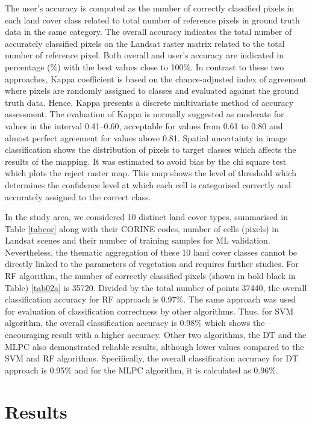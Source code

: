 \documentclass[remotesensing,article,submit,pdftex,moreauthors]{Definitions/mdpi}
\begin{document}
The user's accuracy is computed as the number of correctly classified pixels in each land cover class related to total number of reference pixels in {ground truth} data in the same category. The overall accuracy indicates the total number of accurately classified pixels on the Landsat raster matrix related to the total number of reference pixel. Both overall and user's accuracy are indicated in percentage (\%) with the best values close to 100\%. In contrast to these two approaches, Kappa coefficient is based on the chance-adjusted index of agreement where pixels are randomly assigned to classes and evaluated against the ground truth data. Hence, Kappa presents a discrete multivariate method of accuracy assessment. The evaluation of Kappa is normally suggested as moderate for values in the interval 0.41--0.60, acceptable for values from 0.61 to 0.80 and almost perfect agreement for values above 0.81{. Spatial uncertainty in image classification shows the distribution of pixels to target classes which affects the results of the mapping. It was estimated to avoid bias by the chi square test which plots the reject raster map. This map shows the level of threshold which determines the confidence level at which each cell is categorised correctly and accurately assigned to the correct class.}

In the study area, we {considered 10 distinct land cover types}, summarised in Table \ref{tabcor} along with their CORINE codes, number of cells (pixels) in Landsat scenes and their number of training samples for ML validation. Nevertheless, the thematic aggregation of these 10 land cover classes cannot be directly linked to the parameters of vegetation and requires further studies{. For} RF algorithm, the number of correctly classified pixels (shown in bold black in Table) \ref{tab02a} is 35720. Divided by the total number of points 37440, the overall classification accuracy for RF approach is 0.97\%. The same approach was used for evaluation of classification correctness by other algorithms. Thus, for SVM algorithm, the overall classification accuracy is 0.98\% which shows the encouraging result with a higher accuracy. Other two algorithms, the DT and the MLPC also demonstrated reliable results, although lower values compared to the SVM and RF algorithms. Specifically, the overall classification accuracy for DT approach is 0.95\% and for the MLPC algorithm, it is calculated as 0.96\%. 

\section{Results}\label{sec4}
\end{document}
